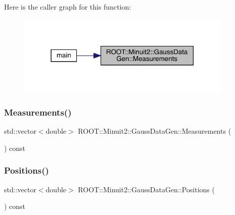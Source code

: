 Here is the caller graph for this function\+:
\nopagebreak
\begin{figure}[H]
\begin{center}
\leavevmode
\includegraphics[width=291pt]{d8/d75/classROOT_1_1Minuit2_1_1GaussDataGen_aa943fffb99444ab2b72198f36b906f71_icgraph}
\end{center}
\end{figure}
\mbox{\label{classROOT_1_1Minuit2_1_1GaussDataGen_aa943fffb99444ab2b72198f36b906f71}} 
\subsubsection{\texorpdfstring{Measurements()}{Measurements()}\hspace{0.1cm}{\footnotesize\ttfamily [2/2]}}
{\footnotesize\ttfamily std\+::vector$<$double$>$ R\+O\+O\+T\+::\+Minuit2\+::\+Gauss\+Data\+Gen\+::\+Measurements (\begin{DoxyParamCaption}{ }\end{DoxyParamCaption}) const\hspace{0.3cm}{\ttfamily [inline]}}

\mbox{\label{classROOT_1_1Minuit2_1_1GaussDataGen_a1f8db2c19b438ac1665045a5737c1d62}} 
\subsubsection{\texorpdfstring{Positions()}{Positions()}\hspace{0.1cm}{\footnotesize\ttfamily [1/2]}}
{\footnotesize\ttfamily std\+::vector$<$double$>$ R\+O\+O\+T\+::\+Minuit2\+::\+Gauss\+Data\+Gen\+::\+Positions (\begin{DoxyParamCaption}{ }\end{DoxyParamCaption}) const\hspace{0.3cm}{\ttfamily [inline]}}

